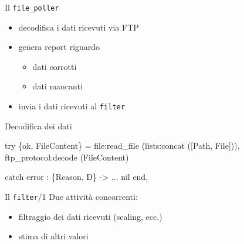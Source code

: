 \documentclass{beamer}
\newcommand{\red}[1]{\textcolor[rgb]{.8,0,0}{#1}}
\newcommand{\blue}[1]{\textcolor[rgb]{0,0,.7}{#1}}
\newcommand{\green}[1]{\textcolor[rgb]{0,.6,.1}{#1}}
\begin{document}
%
\begin{frame}[fragile]{Il \texttt{file\_poller}}
  \begin{itemize}
  \item decodifica i dati ricevuti via \red{FTP}
  \item genera \red{report} riguardo
    \begin{itemize}
    \item dati \red{corrotti}
    \item dati \red{mancanti}
    \end{itemize}
  \item invia i dati ricevuti al \texttt{filter}
  \end{itemize}
\begin{exampleblock}{Decodifica dei dati}
\begin{semiverbatim}
\begin{small}
\green{try}
 \{ok, \blue{FileContent}\} = 
   \red{file:read_file} (lists:concat ([Path, File])),
   \red{ftp_protocol:decode} (\blue{FileContent})
		
\green{catch} error : \{\blue{Reason}, D\} ->
    ...
  nil
\green{end},
\end{small}
\end{semiverbatim}
\end{exampleblock}  
\end{frame}
%

%
\begin{frame}{Il \texttt{filter}/1}
%
Due attivit\`a concorrenti:
\begin{itemize}
\item \red{filtraggio} dei dati ricevuti (scaling, ecc.)
\item \red{stima} di altri valori
\end{itemize}  
%
\begin{figure}[!h]
  \begin{center}
  \end{center}
\end{figure}
\end{frame}
%
\end{document}
